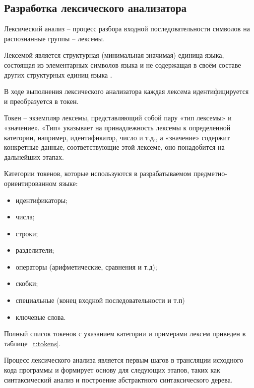 \subsection{Разработка лексического анализатора}


Лексический анализ – процесс разбора входной последовательности символов на распознанные группы – лексемы.

Лексемой является структурная (минимальная значимая) единица языка, состоящая из элементарных символов языка и не содержащая в своём составе других структурных единиц языка .

В ходе выполнения лексического анализатора каждая лексема идентифицируется и преобразуется в токен.

Токен – экземпляр лексемы, представляющий собой пару «тип лексемы» и «значение».
«Тип» указывает на принадлежность лексемы к определенной категории, например, идентификатор, число и т.д.,
а «значение» содержит конкретные данные, соответствующие этой лексеме, оно понадобится на дальнейших этапах.

Категории токенов, которые используются в разрабатываемом предметно-ориентированном языке:
\begin{itemize}
    \item идентификаторы;
    \item числа;
    \item строки;
    \item разделители;
    \item операторы (арифметические, сравнения и т.д);
    \item скобки;
    \item специальные (конец входной последовательности и т.п)
    \item ключевые слова.
\end{itemize}

Полный список токенов с указанием категории и примерами лексем приведен в таблице~\ref{t:tokens}.

Процесс лексического анализа является первым шагов в трансляции исходного кода программы и формирует основу для следующих этапов,
таких как синтаксический анализ и построение абстрактного синтаксического дерева.

\clearpage

